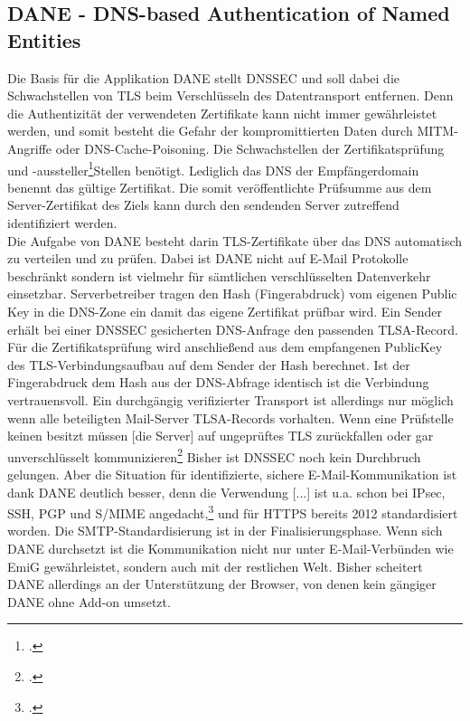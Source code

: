 \documentclass  [paper=a4,
				fontsize=12pt,
				listof=totoc,
				bibliography=totoc
				]{scrreprt}
\begin{document}
		\subsection{DANE - DNS-based Authentication of Named Entities}
		\label{subsec:dane}                                             
			Die Basis für die Applikation \ac{DANE} stellt \ac{DNSSEC} und soll dabei die Schwachstellen von \ac{TLS} beim Verschlüsseln des Datentransport entfernen. Denn die Authentizität der verwendeten Zertifikate kann nicht immer gewährleistet werden, und somit besteht die Gefahr der kompromittierten Daten durch \ac{MITM}-Angriffe oder \ac{DNS}-Cache-Poisoning.
			Die Schwachstellen der Zertifikatsprüfung und -aussteller\footcite[Vgl.][]{Koetter2014}Stellen benötigt. Lediglich das DNS der Empfängerdomain benennt das gültige Zertifikat. Die somit  veröffentlichte Prüfsumme aus dem Server-Zertifikat des Ziels kann durch den sendenden Server zutreffend identifiziert werden.\medskip\\
			Die Aufgabe von \ac{DANE} besteht darin \ac{TLS}-Zertifikate über das \ac{DNS} automatisch zu verteilen und zu prüfen. Dabei ist \ac{DANE} nicht auf E-Mail Protokolle beschränkt sondern ist vielmehr für sämtlichen verschlüsselten Datenverkehr einsetzbar.
			Serverbetreiber tragen den Hash (Fingerabdruck) vom eigenen Public Key in die \ac{DNS}-Zone ein damit das eigene Zertifikat prüfbar wird. Ein Sender erhält bei einer \ac{DNSSEC} gesicherten \ac{DNS}-Anfrage den passenden \ac{TLSA}-Record. Für die Zertifikatsprüfung wird anschließend aus dem empfangenen PublicKey des \ac{TLS}-Verbindungsaufbau auf dem Sender der Hash berechnet. Ist der Fingerabdruck dem Hash aus der \ac{DNS}-Abfrage identisch ist die Verbindung vertrauensvoll.
			Ein durchgängig verifizierter Transport ist allerdings nur möglich wenn alle beteiligten Mail-Server \ac{TLSA}-Records vorhalten. Wenn eine Prüfstelle keinen besitzt \glqq müssen [die Server] auf ungeprüftes \ac{TLS} zurückfallen oder gar unverschlüsselt kommunizieren\grqq\footcite[Vgl.][S. 197]{Koetter2014}
			Bisher ist \ac{DNSSEC} noch kein Durchbruch gelungen. Aber die Situation für identifizierte, sichere E-Mail-Kommunikation ist dank \ac{DANE} deutlich besser, denn \glqq die Verwendung [...] ist u.a. schon bei \ac{IPsec}, \ac{SSH}, \ac{PGP} und \ac{S/MIME} angedacht,\grqq\footcite[Vgl.][S. 196]{Koetter2014} und für \ac{HTTPS} bereits 2012 standardisiert worden. Die \ac{SMTP}-Standardisierung ist in der Finalisierungsphase. Wenn sich \ac{DANE} durchsetzt ist die Kommunikation nicht nur unter E-Mail-Verbünden wie \ac{EmiG} gewährleistet, sondern auch mit der restlichen Welt. Bisher scheitert \ac{DANE} allerdings an der Unterstützung der Browser, von denen kein gängiger \ac{DANE} ohne Add-on umsetzt.
	\pagebreak
\end{document}
